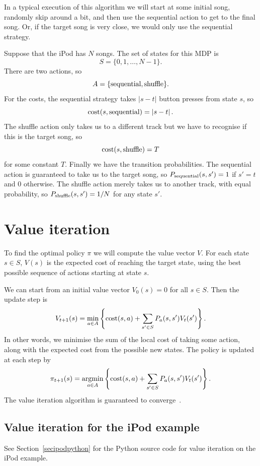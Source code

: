 \documentclass[10pt,amstags,fleqn]{article}
\theoremstyle{plain}
\theoremstyle{definition}
\theoremstyle{definition}
\begin{document}
In a typical execution of this algorithm we will start at some
initial song, randomly skip around a bit, and then use the sequential
action to get to the final song. Or, if the target song is very close,
we would only use the sequential strategy.

Suppose that the iPod has $N$ songs. The set of states for this MDP
is
\[
S = \{0, 1, \dots, N-1\}.
\]
There are two actions, so
\[
A = \{ \textnormal{sequential}, \textnormal{shuffle} \}.
\]
For the costs, the sequential strategy takes
$\left| s - t \right|$ button presses from state  $s$, so
\[
\textnormal{cost}(s, \textnormal{sequential}) = \left| s - t \right|.
\]
The shuffle action only takes us to a different track but we have to
recognise if this is the target song, so
\[
 \textnormal{cost}(s, \textnormal{shuffle}) = T
\]
for some constant $T$.
Finally we have the transition probabilities. The sequential action is
guaranteed to take us to the target song, so
$P_{\textnormal{sequential}}(s,s') = 1$ if $s' = t$ and $0$ otherwise.
The shuffle action merely takes us to another track, with equal
probability, so
$P_{\textnormal{shuffle}}(s,s') = 1/N$ for any state $s'$.

\section{Value iteration}

To find the optimal policy $\pi$ we will compute the value vector $V$.
For each state $s \in S$, $V(s)$ is the expected cost of reaching the
target state, using the best possible sequence of actions starting at
state $s$.

We can start from an initial value vector $V_0(s) = 0$ for all $s \in
S$. Then the update step is
\[
V_{t+1}(s) = \min_{a \in A} \left\{ \textnormal{cost}(s,a) + \sum_{s' \in S} P_a(s,s') V_t(s')\right\}.
\]
In other words, we minimise the sum of the local cost of taking some
action, along with the expected cost from the possible new states.
The policy is updated at each step by
\[
\pi_{t+1}(s) = \underset{a \in A}{\operatorname{argmin}} 
 \left\{ \textnormal{cost}(s,a) + \sum_{s' \in S} P_a(s,s') V_t(s')\right\}.
\]
The value iteration algorithm is guaranteed to
converge~\cite{viconvergence}.

\subsection{Value iteration for the iPod example}

See Section~\ref{secipodpython} for the Python source code for value
iteration on the iPod example.
\end{document}
